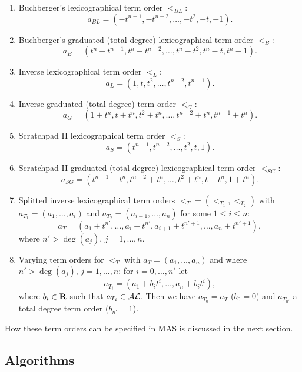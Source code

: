 \begin{enumerate}
\item Buchberger's lexicographical term order
      $<_{BL}$:
      $$a_{BL} = ( - t^{n-1}, - t^{n-2}, \ldots, - t^2, - t, - 1 ).$$ 
\item Buchberger's graduated (total degree) lexicographical 
      term order
      $<_B$:
      $$a_B = ( t^n - t^{n-1}, t^n - t^{n-2}, \ldots, 
             t^n - t^2, t^n - t, t^n - 1 ).$$ 
\item Inverse lexicographical term order
      $<_L$:
      $$a_L = ( 1, t, t^2, \ldots, t^{n-2}, t^{n-1} ).$$ 
\item Inverse graduated (total degree) term order
      $<_G$:
      $$a_G = ( 1 + t^n, t + t^n, t^2 + t^n, \ldots, 
                t^{n-2} + t^n, t^{n-1} + t^n ).$$ 
\item Scratchpad II lexicographical term order
      $<_S$:
      $$a_S = ( t^{n-1}, t^{n-2}, \ldots, t^2, t, 1 ).$$
\item Scratchpad II graduated (total degree) lexicographical 
      term order
      $<_{SG}$:
      $$a_{SG} = ( t^{n-1} + t^n, t^{n-2} + t^n, \ldots, 
             t^2 + t^n, t + t^n, 1 + t^n ).$$
\item Splitted inverse lexicographical term orders 
      $<_{T} = ( <_{T_1}, <_{T_2} )$ with \\ 
      $a_{T_1} = ( a_1, \ldots, a_i )$ and 
      $a_{T_2} = ( a_{i+1}, \ldots, a_n )$ 
      for some $1 \leq i \leq n$:
      $$a_{T} = ( a_1 + t^{n'}, \ldots, a_i + t^{n'}, 
                   a_{i+1} + t^{n'+1}, \ldots, a_n + t^{n'+1} ),$$
      where $n' > \deg(a_j)$, $j=1, \ldots, n$.
\item Varying term orders for 
      $<_{T}$ with $a_{T} = ( a_1, \ldots, a_n )$ and
      where $n' > \deg(a_j)$, $j=1, \ldots, n$:
      for $i = 0, \ldots, n'$ let 
      $$a_{T_i} = ( a_1 + b_i t^{i}, \ldots, a_n + b_i t^{i} ),$$
      where $b_i \in {\bf R}$ such that $a_{T_i} \in {\cal AL}$.
      Then we have $a_{T_0} = a_T$ ($b_0 = 0$) and  
      $a_{T_{n'}}$ a total degree term order ($b_{n'} = 1$).
\end{enumerate}

How these term orders can be specified in MAS
is discussed in the next section.



\subsection{Algorithms} %

